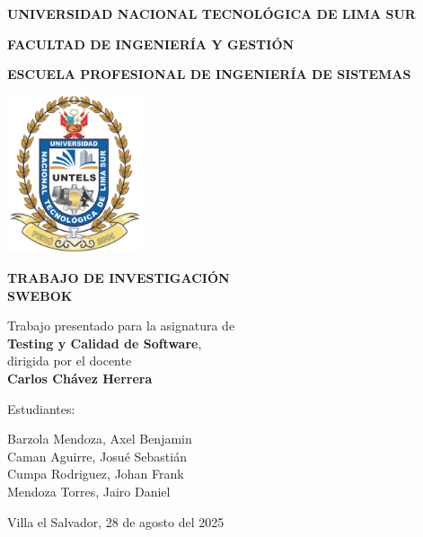 \begin{titlepage}
    \centering
    
    {\Large \textbf{UNIVERSIDAD NACIONAL TECNOLÓGICA DE LIMA SUR}\par}
    \vspace{0.3cm}
    {\large \textbf{FACULTAD DE INGENIERÍA Y GESTIÓN}\par}
    \vspace{0.3cm}
    {\large \textbf{ESCUELA PROFESIONAL DE INGENIERÍA DE SISTEMAS}\par}
    \vfill
    \vspace{0.5cm}
   
    \includegraphics[width=4cm]{image/logo.png}\par\vspace{1cm}
    
    {\textbf{TRABAJO DE INVESTIGACIÓN\\SWEBOK}\par}
    \vspace{1cm}

    {\large Trabajo presentado para la asignatura de\\
    \textbf{Testing y Calidad de Software},\\
    dirigida por el docente\\
    \textbf{Carlos Chávez Herrera}\par}
    \vfill

    {\large Estudiantes:\par}
    \vspace{0.3cm}
    {\large
    Barzola Mendoza, Axel Benjamin\\
    Caman Aguirre, Josué Sebastián\\
    Cumpa Rodriguez, Johan Frank\\
    Mendoza Torres, Jairo Daniel\par}

    \vfill

    {\large Villa el Salvador, 28 de agosto del 2025\par}
\end{titlepage}
